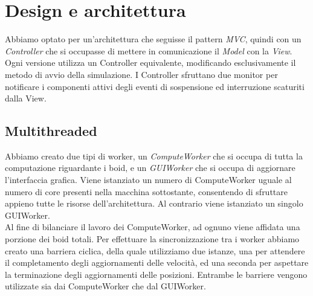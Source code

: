 \documentclass[a4paper,12pt]{report}
\begin{document}
\chapter{Design e architettura}
Abbiamo optato per un'architettura che seguisse il pattern \textit{MVC}, quindi con un \textit{Controller} che si occupasse di mettere in comunicazione il \textit{Model} con la \textit{View}. Ogni versione utilizza un Controller equivalente, modificando esclusivamente il metodo di avvio della simulazione.
I Controller sfruttano due monitor per notificare i componenti attivi degli eventi di sospensione ed interruzione scaturiti dalla View.
\section{Multithreaded}
\label{sec:multithreaded}
Abbiamo creato due tipi di worker, un \textit{ComputeWorker} che si occupa di tutta la computazione riguardante i boid, e un \textit{GUIWorker} che si occupa di aggiornare l'interfaccia grafica. Viene istanziato un numero di ComputeWorker uguale al numero di core presenti nella macchina sottostante, consentendo di sfruttare appieno tutte le risorse dell'architettura. Al contrario viene istanziato un singolo GUIWorker.\\
Al fine di bilanciare il lavoro dei ComputeWorker, ad ognuno viene affidata una porzione dei boid totali.
Per effettuare la sincronizzazione tra i worker abbiamo creato una barriera ciclica, della quale utilizziamo due istanze, una per attendere il completamento degli aggiornamenti delle velocità, ed una seconda per aspettare la terminazione degli aggiornamenti delle posizioni. Entrambe le barriere vengono utilizzate sia dai ComputeWorker che dal GUIWorker.
\end{document}
